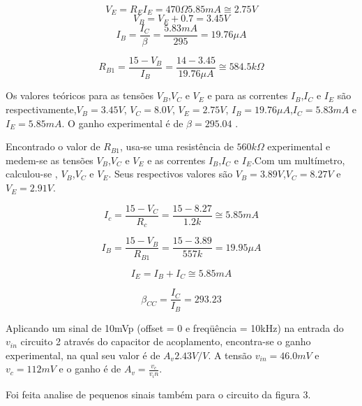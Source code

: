 \documentclass[a4paper]{article} %
\begin{document}
\begin{displaymath}
V_E=R_EI_E=470\Omega 5.85mA \cong 2.75V
\end{displaymath}
\begin{displaymath}
V_B=V_E+0.7=3.45V
\end{displaymath}
\begin{displaymath}
I_B=\frac{I_C}{\beta}=\frac{5.83mA}{295}=19.76\mu A
\end{displaymath}



\begin{displaymath}
R_{B1}=\frac{15-V_B}{I_B}=\frac{14-3.45}{19.76\mu A} \cong 584.5k\Omega 
\end{displaymath}


Os valores teóricos para as tensões $V_B$,$V_C$ e $V_E$ e para as correntes $I_B$,$I_C$ e $I_E$
são respectivamente,$V_B=3.45V$, $V_C=8.0V$, $V_E=2.75V$, $I_B=19.76 \mu A$,$I_C=5.83mA$ e $I_E=5.85mA$.
O ganho experimental é de $\beta =295.04$ . 


Encontrado o valor de $R_{B1}$, usa-se uma resistência de $560k\Omega$
experimental e medem-se as tensões $V_B$,$V_C$ e $V_E$  e as correntes $I_B$,$I_C$ e $I_E$.Com um
multímetro, calculou-se , $V_B$,$V_C$ e $V_E$. Seus respectivos valores são $V_B=3.89V$,$V_C=8.27V$
e $V_E=2.91V$.




\begin{displaymath}
I_c=\frac{15-V_C}{R_c}=\frac{15-8.27}{1.2k}\cong5.85mA
\end{displaymath}


\begin{displaymath}
I_B=\frac{15-V_B}{R_{B1}}=\frac{15-3.89}{557k}=19.95\mu A
\end{displaymath}


\begin{displaymath}
I_E=I_B+I_C \cong 5.85mA
\end{displaymath}

\begin{displaymath}
\beta_{CC}=\frac{I_C}{I_B}=293.23
\end{displaymath}

Aplicando um sinal de 10mVp (offset = 0 e freqüência = 10kHz) na entrada
do $v_{in}$ circuito 2 através do capacitor de acoplamento, encontra-se o ganho experimental, na
qual seu valor é de $A_v 2.43 V/V$. A tensão $v_{in}= 46.0mV$ e $v_c=112mV$ e o ganho
é de $A_v=\frac{v_c}{v_in}$.

Foi feita analise de pequenos sinais também para o circuito da figura 3.
\end{document}
